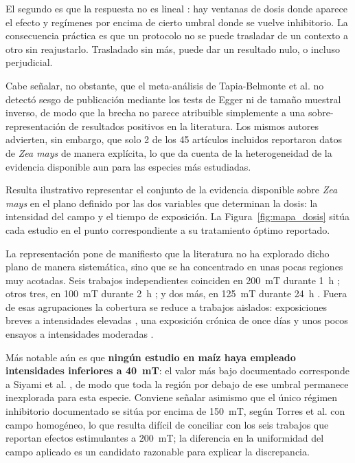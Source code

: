 El segundo es que la respuesta no es lineal \cite{torres_2019, maffei_2022}: hay ventanas de dosis donde aparece el efecto y regímenes por encima de cierto umbral donde se vuelve inhibitorio. La consecuencia práctica es que un protocolo no se puede trasladar de un contexto a otro sin reajustarlo. Trasladado sin más, puede dar un resultado nulo, o incluso perjudicial.

Cabe señalar, no obstante, que el meta-análisis de Tapia-Belmonte et al. \cite{tapia_belmonte_2023} no detectó sesgo de publicación mediante los tests de Egger ni de tamaño muestral inverso, de modo que la brecha no parece atribuible simplemente a una sobre-representación de resultados positivos en la literatura. Los mismos autores advierten, sin embargo, que solo 2 de los 45 artículos incluidos reportaron datos de \textit{Zea mays} de manera explícita, lo que da cuenta de la heterogeneidad de la evidencia disponible aun para las especies más estudiadas.

Resulta ilustrativo representar el conjunto de la evidencia disponible sobre \textit{Zea mays} en el plano definido por las dos variables que determinan la dosis: la intensidad del campo y el tiempo de exposición. La Figura~\ref{fig:mapa_dosis} sitúa cada estudio en el punto correspondiente a su tratamiento óptimo reportado.

La representación pone de manifiesto que la literatura no ha explorado dicho plano de manera sistemática, sino que se ha concentrado en unas pocas regiones muy acotadas. Seis trabajos independientes coinciden en 200~mT durante 1~h \cite{anand_2012, shine_guruprasad_2012, kataria_2017, shine_2017, vashisth_joshi_2017, vashisth_nagarajan_2010}; otros tres, en 100~mT durante 2~h \cite{anand_2012, vashisth_nagarajan_2009, sharma_2017}; y dos más, en 125~mT durante 24~h \cite{florez_2007, martinez_2017}. Fuera de esas agrupaciones la cobertura se reduce a trabajos aislados: exposiciones breves a intensidades elevadas \cite{aladjadjiyan_2002, dominguez_pacheco_2010, zepeda_bautista_2014, torres_socorro_2018}, una exposición crónica de once días \cite{racuciu_2006} y unos pocos ensayos a intensidades moderadas \cite{siyami_2018, torres_2019}.

Más notable aún es que \textbf{ningún estudio en maíz haya empleado intensidades inferiores a 40~mT}: el valor más bajo documentado corresponde a Siyami et al. \cite{siyami_2018}, de modo que toda la región por debajo de ese umbral permanece inexplorada para esta especie. Conviene señalar asimismo que el único régimen inhibitorio documentado se sitúa por encima de 150~mT, según Torres et al. \cite{torres_2019} con campo homogéneo, lo que resulta difícil de conciliar con los seis trabajos que reportan efectos estimulantes a 200~mT; la diferencia en la uniformidad del campo aplicado es un candidato razonable para explicar la discrepancia.

